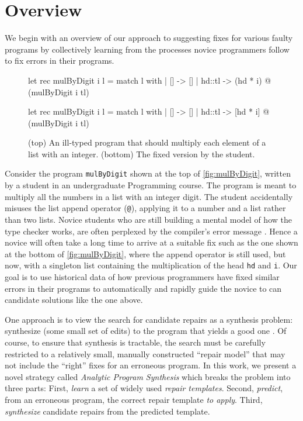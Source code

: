 \section{Overview}
\label{sec:overview}

We begin with an overview of our approach to suggesting fixes for various faulty
programs by collectively learning from the processes novice programmers follow
to fix errors in their programs.

\begin{figure}[ht]
\begin{ecode}
let rec mulByDigit i l =
  match l with
  | []     -> []
  | hd::tl -> (hd * i) @ (mulByDigit i tl)
\end{ecode}

\begin{ecode}
let rec mulByDigit i l =
  match l with
  | []     -> []
  | hd::tl -> [hd * i] @ (mulByDigit i tl)
\end{ecode}
\caption{(top) An ill-typed \ocaml program that should multiply each element
of a list with an integer. (bottom) The fixed version by the student.}
\label{fig:mulByDigit}
\end{figure}


 Consider the program \texttt{mulByDigit} shown at 
the top of \autoref{fig:mulByDigit}, written by a student in an undergraduate 
Programming course. The program is meant to multiply all the numbers in a list
with an integer digit. The student accidentally misuses the list append
operator (\texttt{@}), applying it to a number and a list rather than two lists.
%
Novice students who are still building a mental model of how the type checker
works, are often perplexed by the compiler's error message \cite{fixme}. 
Hence a novice will often take a long time to arrive at a suitable fix 
such as the one shown at the bottom of \autoref{fig:mulByDigit}, where 
the append operator is still used, but now, with a singleton list 
containing the multiplication of the head \texttt{hd} and \texttt{i}.
%
Our goal is to use historical data of how previous programmers have fixed
similar errors in their programs to automatically and rapidly guide the novice
to can candidate solutions like the one above.

%
One approach is to view the search for candidate repairs as a 
synthesis problem: synthesize (some small set of edits) to the 
program that yields a good one \cite{rishabh2013,fixme}.
%
Of course, to ensure that synthesis is tractable, the search must be 
carefully restricted to a relatively small, manually constructed 
``repair model'' that may not include the ``right'' fixes for an
erroneous program.
%
In this work, we present a novel strategy called 
\emph{Analytic Program Synthesis} which breaks the 
problem into three parts: 
%
First, \emph{learn} a set of widely used \emph{repair templates}.
%
Second, \emph{predict}, from an erroneous program, the correct repair template \emph{to apply}.
%
Third, \emph{synthesize} candidate repairs from the predicted template.


